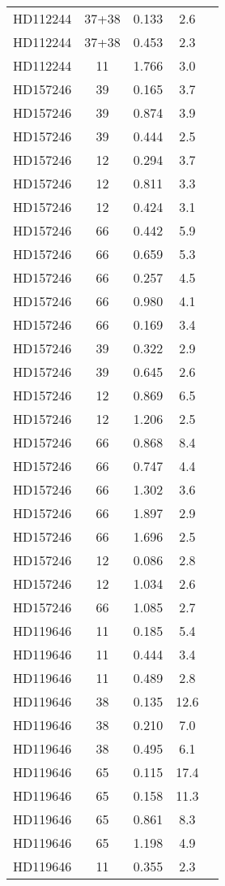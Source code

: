 \begin{table*}
\begin{tabular}{l c c c c}
HD112244 & 37+38 & 0.133 & 2.6\\ 
HD112244 & 37+38 & 0.453 & 2.3\\ 
HD112244 & 11 & 1.766 & 3.0\\ 
\hline
HD157246 & 39 & 0.165 & 3.7\\ 
HD157246 & 39 & 0.874 & 3.9\\ 
HD157246 & 39 & 0.444 & 2.5\\ 
HD157246 & 12 & 0.294 & 3.7\\ 
HD157246 & 12 & 0.811 & 3.3\\ 
HD157246 & 12 & 0.424 & 3.1\\ 
HD157246 & 66 & 0.442 & 5.9\\ 
HD157246 & 66 & 0.659 & 5.3\\ 
HD157246 & 66 & 0.257 & 4.5\\ 
HD157246 & 66 & 0.980 & 4.1\\ 
HD157246 & 66 & 0.169 & 3.4\\ 
HD157246 & 39 & 0.322 & 2.9\\ 
HD157246 & 39 & 0.645 & 2.6\\ 
HD157246 & 12 & 0.869 & 6.5\\ 
HD157246 & 12 & 1.206 & 2.5\\ 
HD157246 & 66 & 0.868 & 8.4\\ 
HD157246 & 66 & 0.747 & 4.4\\ 
HD157246 & 66 & 1.302 & 3.6\\ 
HD157246 & 66 & 1.897 & 2.9\\ 
HD157246 & 66 & 1.696 & 2.5\\ 
HD157246 & 12 & 0.086 & 2.8\\ 
HD157246 & 12 & 1.034 & 2.6\\ 
HD157246 & 66 & 1.085 & 2.7\\ 
\hline
HD119646 & 11 & 0.185 & 5.4\\ 
HD119646 & 11 & 0.444 & 3.4\\ 
HD119646 & 11 & 0.489 & 2.8\\ 
HD119646 & 38 & 0.135 & 12.6\\ 
HD119646 & 38 & 0.210 & 7.0\\ 
HD119646 & 38 & 0.495 & 6.1\\ 
HD119646 & 65 & 0.115 & 17.4\\ 
HD119646 & 65 & 0.158 & 11.3\\ 
HD119646 & 65 & 0.861 & 8.3\\ 
HD119646 & 65 & 1.198 & 4.9\\ 
HD119646 & 11 & 0.355 & 2.3\\ 

\end{tabular}
\end{table*}
